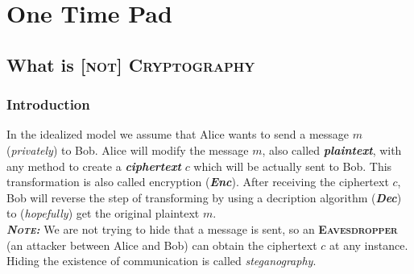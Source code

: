 \documentclass{article}
\begin{document}
	\pagestyle{fancy}
	\section{One Time Pad}
		\begin{adjustwidth}{2em}{}
			\subsection{What is [\textsc{not}] \textsc{Cryptography}}
			\begin{adjustwidth}{2em}{}
				\subsubsection{Introduction}
					\begin{adjustwidth}{2em}{4em}
						In the idealized model we assume that Alice wants to send a message $m$ (\textit{privately}) to Bob. Alice will modify the message $m$, also called \textit{\textbf{plaintext}}, with any method to create a \textit{\textbf{ciphertext}} $c$ which will be actually sent to Bob. This transformation is also called encryption (\textit{\textbf{Enc}}). After receiving the ciphertext $c$, Bob will reverse the step of transforming by using a decription algorithm (\textit{\textbf{Dec}}) to (\textit{hopefully}) get the original plaintext $m$. \\
						\textit{\textbf{\textsc{Note:}}} We are not trying to hide that a message is sent, so an \textbf{\textsc{Eavesdropper}} (an attacker between Alice and Bob) can obtain the ciphertext $c$ at any instance. Hiding the existence of communication is called \textit{steganography}.
						\\
						\begin{adjustwidth}{1em}{}
\end{adjustwidth}
\end{adjustwidth}
\end{adjustwidth}
\end{adjustwidth}
\end{document}
